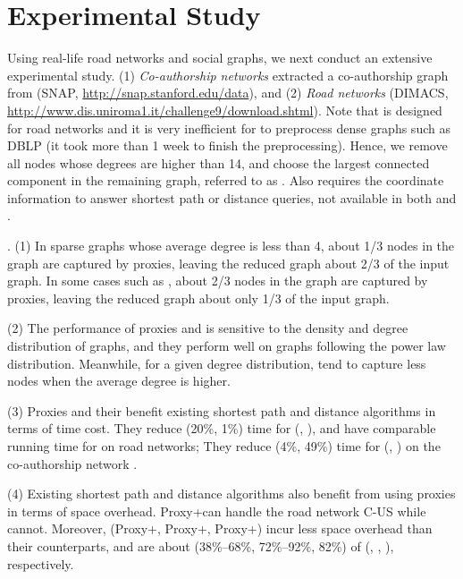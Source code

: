 \section{Experimental Study}
\label{sec-expt}


Using real-life road networks and social graphs, we next conduct an extensive experimental study.
(1) {\em Co-authorship networks} extracted a co-authorship graph from \dblp (SNAP, \url{http://snap.stanford.edu/data}),
 and (2) {\em Road networks} (DIMACS, \url{http://www.dis.uniroma1.it/challenge9/download.shtml}).
Note that \tnr is designed for road networks and it is very inefficient for \tnr to preprocess dense graphs such as DBLP (it took more than 1 week to finish the preprocessing). Hence, we remove all nodes whose degrees are higher than 14, and choose the largest connected component in the remaining graph, referred to as \dblpone. Also \ah requires the coordinate information to answer shortest path or distance queries, not available in both \dblp and \dblpone.

.
(1) In sparse graphs whose average degree is less than 4, about 1/3 nodes in the graph are captured by proxies, leaving the reduced graph about 2/3 of the input graph. In some cases such as \dblpone, about 2/3 nodes in the graph are captured by proxies, leaving the reduced graph about only 1/3 of the input graph.

\sstab(2) The performance of proxies and \dras is sensitive to the density and degree distribution of graphs, and they perform well on graphs following the power law distribution. Meanwhile, for a given degree distribution, \dras tend to capture less nodes when the average degree is higher.

\sstab(3) Proxies and their \dras benefit existing shortest path and distance algorithms in terms of time cost. They reduce (20\%, 1\%) time for (\arcflag, \ah), and have comparable running time for \tnr on road networks; They reduce (4\%, 49\%) time for (\arcflag, \tnr) on the co-authorship network \dblpone.

\sstab(4) Existing shortest path and distance algorithms also benefit from using proxies in terms of space overhead. Proxy+\tnr can handle the road network C-US while \tnr cannot. Moreover, (Proxy+\arcflag, Proxy+\tnr, Proxy+\ah) incur less space overhead than their counterparts, and are about (38\%--68\%, 72\%--92\%, 82\%) of (\arcflag, \tnr, \ah), respectively.

